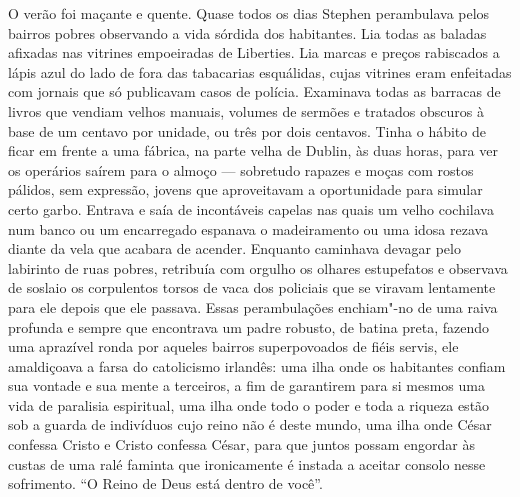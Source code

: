 O verão foi maçante e quente.  \label{quase"-todos} Quase todos os dias Stephen perambulava pelos
bairros pobres observando a vida sórdida dos habitantes.  Lia todas as baladas
afixadas nas vitrines empoeiradas de Liberties.  Lia marcas e preços rabiscados
a lápis azul do lado de fora das tabacarias esquálidas, cujas vitrines eram
enfeitadas com jornais que só publicavam casos de polícia.  Examinava todas as
barracas de livros que vendiam velhos manuais, volumes de sermões e tratados
obscuros à base de um centavo por unidade, ou três por dois centavos.
Tinha o hábito de ficar em frente a uma fábrica, na parte velha de Dublin, às
duas horas, para ver os operários saírem para o almoço ---  sobretudo rapazes e
moças com rostos pálidos, sem expressão, jovens que aproveitavam a oportunidade
para simular certo garbo.  Entrava e saía de incontáveis capelas nas quais um
velho cochilava num banco ou um encarregado espanava o madeiramento ou uma
idosa rezava diante da vela que acabara de acender.  Enquanto caminhava devagar
pelo labirinto de ruas pobres, retribuía com orgulho os olhares estupefatos e
observava de soslaio os corpulentos torsos de vaca dos policiais que se viravam
lentamente para ele depois que ele passava.  Essas perambulações enchiam"-no de
uma raiva profunda e sempre que encontrava um padre robusto, de batina preta,
fazendo uma aprazível ronda por aqueles bairros superpovoados de fiéis servis,
ele amaldiçoava a farsa do catolicismo irlandês: uma ilha onde os habitantes
confiam sua vontade e sua mente a terceiros, a fim de garantirem para si mesmos
uma vida de paralisia espiritual, uma ilha onde todo o poder e toda a riqueza
estão sob a guarda de indivíduos cujo reino não é deste mundo, uma ilha onde
César confessa Cristo e Cristo confessa César, para que juntos
possam engordar às custas de uma ralé faminta que ironicamente é instada a
aceitar consolo nesse sofrimento.  “O Reino de Deus está dentro de você”.

